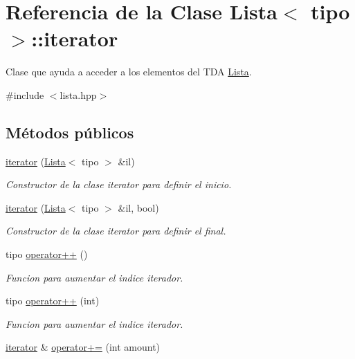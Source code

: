 \hypertarget{classLista_1_1iterator}{}\section{Referencia de la Clase Lista$<$ tipo $>$\+:\+:iterator}
\label{classLista_1_1iterator}


Clase que ayuda a acceder a los elementos del T\+DA \hyperlink{classLista}{Lista}.  




{\ttfamily \#include $<$lista.\+hpp$>$}

\subsection*{Métodos públicos}
\begin{DoxyCompactItemize}
\item 
\hyperlink{classLista_1_1iterator_a1535d6055cf70a60518be63c0f62cc1d}{iterator} (\hyperlink{classLista}{Lista}$<$ tipo $>$ \&il)
\begin{DoxyCompactList}\small\item\em Constructor de la clase iterator para definir el inicio. \end{DoxyCompactList}\item 
\hyperlink{classLista_1_1iterator_ad96ff61e26fb131406d0b320b36e9516}{iterator} (\hyperlink{classLista}{Lista}$<$ tipo $>$ \&il, bool)
\begin{DoxyCompactList}\small\item\em Constructor de la clase iterator para definir el final. \end{DoxyCompactList}\item 
tipo \hyperlink{classLista_1_1iterator_af8c7d385ce8bc7c62b8bc806db714ae9}{operator++} ()
\begin{DoxyCompactList}\small\item\em Funcion para aumentar el indice iterador. \end{DoxyCompactList}\item 
tipo \hyperlink{classLista_1_1iterator_ac9059ed8e1f396ec967ae97b571d11fe}{operator++} (int)
\begin{DoxyCompactList}\small\item\em Funcion para aumentar el indice iterador. \end{DoxyCompactList}\item 
\hyperlink{classLista_1_1iterator}{iterator} \& \hyperlink{classLista_1_1iterator_a99315852e99d13cfac11f570917ac092}{operator+=} (int amount)

\end{DoxyCompactItemize}
